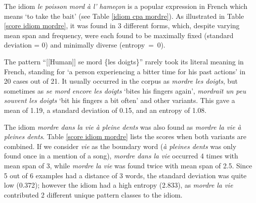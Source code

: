 \documentclass[output=paper]{langsci/langscibook}
\begin{document}
 
The idiom \textit{le poisson mord à l' hameçon} is a popular expression in
French which means `to take the bait' (see Table \ref{idiom cpa mordre}).
As illustrated in
Table \ref{score idiom mordre}, it was found in 3 different forms, which, despite varying mean
span and frequency, were each found to be maximally fixed (standard
deviation = 0) and minimally diverse (entropy~=~0).



The pattern “$[$$[$Human$]$$]$ se mord \{les doigts\}” rarely took its literal
meaning in French, standing for `a person experiencing a bitter time
for his past actions' in 20 cases out of 21. It usually occurred in the
corpus as \textit{mordre les doigts}, but sometimes as \textit{se mord encore les
doigts} `bites his fingers again', \textit{mordrait un peu souvent les
doigts} `bit his fingers a bit often' and other variants. This gave a
mean of 1.19, a standard deviation of 0.15, and an entropy of 1.08.



The idiom \textit{mordre dans la vie à pleine dents} was also found as \textit{mordre
la vie à pleines dents}. Table \ref{score idiom mordre} lists the scores when both variants are
combined. If we consider \textit{vie} as the boundary word (\textit{à pleines dents}
was only found once in a mention of a song), \textit{mordre dans la vie}
occurred 4 times with mean span of 3, while \textit{mordre la vie} was found
twice with mean span of 2.5. Since 5 out of 6 examples had a distance
of 3 words, the standard deviation was quite low (0.372); however the
idiom had a high entropy (2.833), as \textit{mordre la vie} contributed 2
different unique pattern classes to the idiom. 
\end{document}
